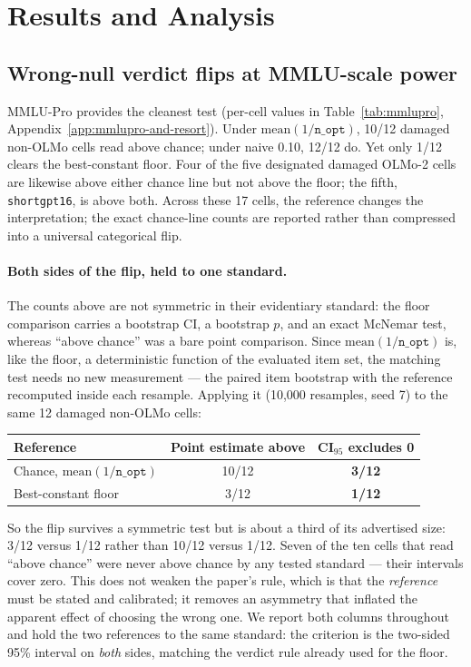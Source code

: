 \section{Results and Analysis}

\subsection{Wrong-null verdict flips at MMLU-scale power}
\label{sec:flips}

MMLU-Pro provides the cleanest test (per-cell values in Table~\ref{tab:mmlupro}, Appendix~\ref{app:mmlupro-and-resort}).
Under $\mathrm{mean}(1/\texttt{n\_opt})$, 10/12 damaged non-OLMo cells read above chance; under naive 0.10, 12/12 do. Yet only 1/12 clears the best-constant floor. Four of the five designated damaged OLMo-2 cells are likewise above either chance line but not above the floor; the fifth, \texttt{shortgpt16}, is above both. Across these 17 cells, the reference changes the interpretation; the exact chance-line counts are reported rather than compressed into a universal categorical flip.

\paragraph{Both sides of the flip, held to one standard.}
The counts above are not symmetric in their evidentiary standard: the floor comparison carries a bootstrap CI, a bootstrap $p$, and an exact McNemar test, whereas ``above chance'' was a bare point comparison. Since $\mathrm{mean}(1/\texttt{n\_opt})$ is, like the floor, a deterministic function of the evaluated item set, the matching test needs no new measurement --- the paired item bootstrap with the reference recomputed inside each resample. Applying it (10{,}000 resamples, seed 7) to the same 12 damaged non-OLMo cells:

\begin{center}
\begin{tabular}{lcc}
\toprule
Reference & Point estimate above & CI$_{95}$ excludes 0 \\
\midrule
Chance, $\mathrm{mean}(1/\texttt{n\_opt})$ & 10/12 & \textbf{3/12} \\
Best-constant floor & 3/12 & \textbf{1/12} \\
\bottomrule
\end{tabular}
\end{center}

So the flip survives a symmetric test but is about a third of its advertised size: 3/12 versus 1/12 rather than 10/12 versus 1/12. Seven of the ten cells that read ``above chance'' were never above chance by any tested standard --- their intervals cover zero. This does not weaken the paper's rule, which is that the \emph{reference} must be stated and calibrated; it removes an asymmetry that inflated the apparent effect of choosing the wrong one. We report both columns throughout and hold the two references to the same standard: the criterion is the two-sided 95\% interval on \emph{both} sides, matching the verdict rule already used for the floor.

